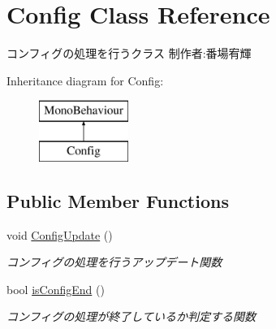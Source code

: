 \hypertarget{class_config}{}\section{Config Class Reference}
\label{class_config}


コンフィグの処理を行うクラス 制作者\+:番場宥輝  


Inheritance diagram for Config\+:\begin{figure}[H]
\begin{center}
\leavevmode
\includegraphics[height=2.000000cm]{class_config}
\end{center}
\end{figure}
\subsection*{Public Member Functions}
\begin{DoxyCompactItemize}
\item 
void \hyperlink{class_config_a025cd5d374f44cbd1265d63f69a7c239}{Config\+Update} ()
\begin{DoxyCompactList}\small\item\em コンフィグの処理を行うアップデート関数 \end{DoxyCompactList}\item 
bool \hyperlink{class_config_af38d765e1fafbca28181b723a067b109}{is\+Config\+End} ()
\begin{DoxyCompactList}\small\item\em コンフィグの処理が終了しているか判定する関数 \end{DoxyCompactList}\end{DoxyCompactItemize}
